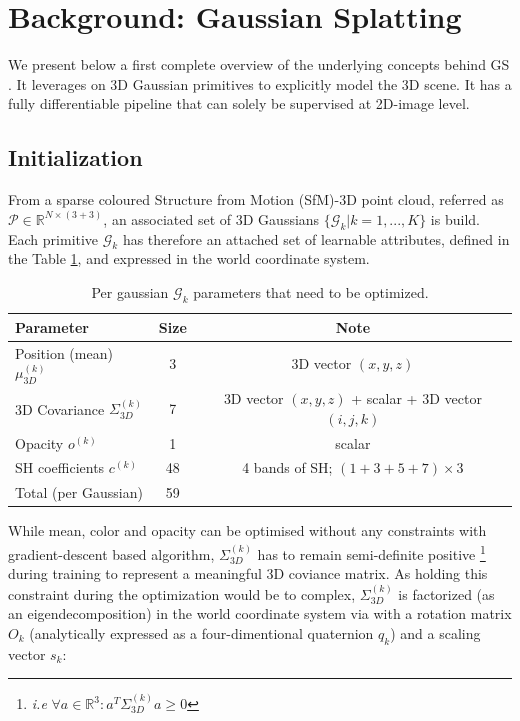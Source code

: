\section{Background: Gaussian Splatting}
We present below a first complete overview of the underlying concepts behind \ac{GS} \citep{kerbl20233d}. It leverages on 3D Gaussian primitives to explicitly model the 3D scene. It has a fully differentiable pipeline that can solely be supervised at 2D-image level. 


\subsection{Initialization} From a sparse coloured Structure from Motion (SfM)-3D point cloud, referred as $\mathcal{P}\in\mathbb{R}^{N\times(3+3)}$, an associated set of 3D Gaussians $\{\mathcal{G}_{k}|k=1,...,K\}$ is build. Each primitive $\mathcal{G}_{k} $ has therefore an attached set of learnable attributes, defined in the Table \ref{tab:gauss-param}, and expressed in the world coordinate system.

\begin{table}[h!]
  \centering
   \caption{Per gaussian $\mathcal{G}_{k} $  parameters that need to be optimized.}
  \begin{tabular}{lcc}
  \hline
  Parameter  & Size & Note \\
  \hline
  Position (mean)  $\mu^{(k)}_{3D}$ & 3 & 3D vector $(x, y, z)$ \\
  3D Covariance $\Sigma^{(k)}_{3D}$ & 7 & 3D vector $(x, y, z)$ + scalar + 3D vector  $(i, j, k)$\\
  Opacity  $o^{(k)}$ & 1 & scalar \\
  SH coefficients  $c^{(k)}$ & 48 & 4 bands of SH; $(1+3+5+7)\times3$ \\
  \hline
  Total (per Gaussian)  & 59 & \\
  \hline
  \end{tabular}
 
  \label{tab:gauss-param}
\end{table}

While mean, color and opacity can be optimised without any constraints with gradient-descent based algorithm, $\Sigma^{(k)}_{3D}$ has to remain semi-definite positive \footnote{\textit{i.e} $ \forall a \in \mathbb{R}^{3}: a^{T}\Sigma^{(k)}_{3D}a \geq 0$} during training to represent a meaningful 3D coviance matrix. As holding this constraint during the optimization would be to complex, $\Sigma^{(k)}_{3D}$ is factorized (as an eigendecomposition) in the world coordinate system via with a rotation matrix $O_{k}$ (analytically expressed as a four-dimentional quaternion $q_{k}$) and a scaling vector $s_{k}$: 

